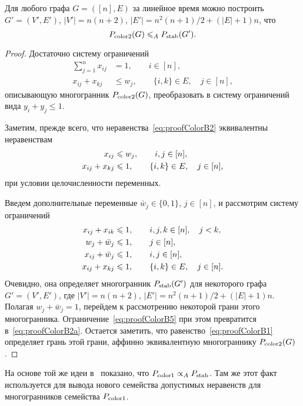 \begin{prop}\label{prop:ColorB}
	Для любого графа $G=([n],E)$ за линейное время можно построить $G'=(V',E')$, $|V'| = n(n+2)$, $|E'|=n^2(n+1)/2+(|E|+1)n$, что 
	\[
	\ColorB(G) \lea \Stable(G').
	\]
\end{prop}
\begin{proof}
	Достаточно систему ограничений
	\begin{align}
	\sum_{j=1}^n x_{ij} &= 1, \qquad i\in[n], \label{eq:proofColorB1}\\
	x_{ij} + x_{kj} &\le w_j, \qquad \{i,k\} \in E, \quad j\in[n], \label{eq:proofColorB2}
	\end{align}
	описывающую многогранник $\ColorB(G)$,
	преобразовать в систему ограничений вида $y_i + y_j \le 1$.
	
	Заметим, прежде всего, что неравенства~\eqref{eq:proofColorB2} эквивалентны неравенствам 
	\begin{align}
	x_{ij} &\le w_j, \qquad i,j\in[n], \label{eq:proofColorB2a}\\
	x_{ij} + x_{kj} &\le 1, \qquad \{i,k\} \in E, \quad j\in[n], \notag
	\end{align}
	при условии целочисленности переменных.
	
	Введем дополнительные переменные $\bar{w}_j \in \{0,1\}$, $j\in[n]$, и рассмотрим систему ограничений
	\begin{align}
	x_{ij} + x_{ik} &\le 1, \qquad i,j,k\in[n], \quad j < k, \notag \\
	w_j + \bar{w}_j &\le 1, \qquad j\in[n], \notag\\
	x_{ij} + \bar{w}_j &\le 1, \qquad i,j\in[n], \label{eq:proofColorB5}\\
	x_{ij} + x_{kj} &\le 1, \qquad \{i,k\} \in E, \quad j\in[n]. \notag %
	\end{align}
	Очевидно, она определяет многогранник $\Stable(G')$ для некоторого графа $G'=(V',E')$, где $|V'| = n(n+2)$, $|E'|=n^2(n+1)/2+(|E|+1)n$.
	Полагая $w_j + \bar{w}_j = 1$, перейдем к рассмотрению некоторой грани этого многогранника.
	Ограничение~\eqref{eq:proofColorB5} при этом превратится в~\eqref{eq:proofColorB2a}.
	Остается заметить, что равенство~\eqref{eq:proofColorB1} определяет грань этой грани, аффинно эквивалентную многограннику $\ColorB(G)$.
\end{proof}

\begin{remark}
	На основе той же идеи в~\cite{Delle:2016} показано, что $\ColorA \propto_A \Stable$. Там же этот факт используется для вывода нового семейства допустимых неравенств для многогранников семейства $\ColorA$.
\end{remark}

